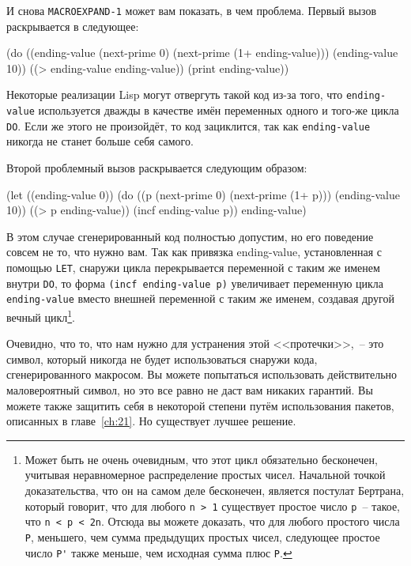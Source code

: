 И снова \lstinline{MACROEXPAND-1} может вам показать, в чем проблема. Первый вызов
раскрывается в следующее:

\begin{myverb}
(do ((ending-value (next-prime 0) (next-prime (1+ ending-value)))
     (ending-value 10))
    ((> ending-value ending-value))
  (print ending-value))
\end{myverb}

Некоторые реализации Lisp могут отвергуть такой код из-за того, что \lstinline{ending-value}
используется дважды в качестве имён переменных одного и того-же цикла \lstinline{DO}. Если же
этого не произойдёт, то код зациклится, так как \lstinline{ending-value} никогда не станет
больше себя самого.

Второй проблемный вызов раскрывается следующим образом:

\begin{myverb}
(let ((ending-value 0))
  (do ((p (next-prime 0) (next-prime (1+ p)))
       (ending-value 10))
      ((> p ending-value))
    (incf ending-value p))
  ending-value)
\end{myverb}

В этом случае сгенерированный код полностью допустим, но его поведение совсем не то, что
нужно вам. Так как привязка ending-value, установленная с помощью \lstinline{LET}, снаружи
цикла перекрывается переменной с таким же именем внутри \lstinline{DO}, то форма 
\lstinline{(incf ending-value p)} увеличивает переменную цикла \lstinline{ending-value} вместо внешней
переменной с таким же именем, создавая другой вечный цикл\footnote{Может быть не очень
  очевидным, что этот цикл обязательно бесконечен, учитывая неравномерное распределение
  простых чисел. Начальной точкой доказательства, что он на самом деле бесконечен,
  является постулат Бертрана, который говорит, что для любого \lstinline{n > 1} существует
  простое число \lstinline{p}~-- такое, что \lstinline!n < p < 2n!. Отсюда вы можете доказать, что
  для любого простого числа \lstinline{P}, меньшего, чем сумма предыдущих простых чисел,
  следующее простое число \lstinline{P'} также меньше, чем исходная сумма плюс \lstinline{P}.}.

Очевидно, что то, что нам нужно для устранения этой <<протечки>>,~-- это символ, который
никогда не будет использоваться снаружи кода, сгенерированного макросом. Вы можете
попытаться использовать действительно маловероятный символ, но это все равно не даст вам
никаких гарантий. Вы можете также защитить себя в некоторой степени путём использования
пакетов, описанных в главе~\ref{ch:21}. Но существует лучшее решение.

